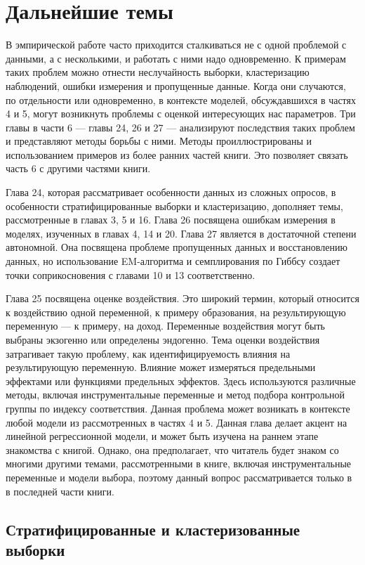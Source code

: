 
\part{Дальнейшие темы}

\noindent В эмпирической работе часто приходится сталкиваться не с одной проблемой с данными, а с несколькими, и работать с ними надо одновременно. К примерам таких проблем можно отнести неслучайность выборки, кластеризацию наблюдений, ошибки измерения и пропущенные данные. Когда они случаются, по отдельности или одновременно, в контексте моделей, обсуждавшихся в частях 4 и 5, могут возникнуть проблемы с оценкой интересующих нас параметров. Три главы в части 6 --- главы 24, 26 и 27 --- анализируют последствия таких проблем и представляют методы борьбы с ними. Методы проиллюстрированы и использованием примеров из более ранних частей книги. Это позволяет связать часть 6 с другими частями книги. 

Глава 24, которая рассматривает особенности данных из сложных опросов, в особенности стратифицированные выборки и кластеризацию, дополняет темы, рассмотренные в главах 3, 5 и 16. Глава 26 посвящена ошибкам измерения в моделях, изученных в главах 4, 14 и 20. Глава 27 является в достаточной степени автономной. Она посвящена проблеме пропущенных данных и восстановлению данных, но использование EM-алгоритма и семплирования по Гиббсу создает точки соприкосновения с главами 10 и 13 соответственно. 

Глава 25 посвящена оценке воздействия. Это широкий термин, который относится к воздействию одной переменной, к примеру образования, на результирующую переменную --- к примеру, на доход. Переменные воздействия могут быть выбраны экзогенно или определены эндогенно. Тема оценки воздействия затрагивает такую проблему, как идентифицируемость влияния на результирующую переменную. Влияние может измеряться предельными эффектами или функциями предельных эффектов. Здесь используются различные методы, включая инструментальные переменные и метод подбора контрольной группы по индексу соответствия. Данная проблема может возникать в контексте любой модели из рассмотренных в частях 4 и 5. Данная глава делает акцент на линейной регрессионной модели, и может быть изучена на раннем этапе знакомства с книгой. Однако, она предполагает, что читатель будет знаком со многими другими темами, рассмотренными в книге, включая инструментальные переменные и модели выбора, поэтому данный вопрос рассматривается только в в последней части книги. 


\chapter{Стратифицированные и кластеризованные выборки}


